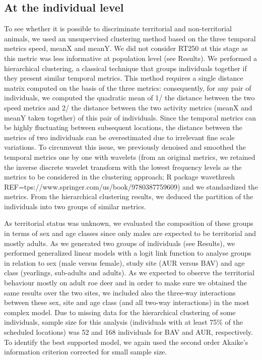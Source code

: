 \documentclass[a4paper,11pt]{article}
\newcommand{\nico}[1]{\todo[backgroundcolor=red!25,bordercolor=red]{\small #1}}
\begin{document}
\subsection*{At the individual level}
To see whether it is possible to discriminate territorial and
non-territorial animals, we used an unsupervised clustering method
based on the three temporal metrics speed, meanX and meanY. We did not
consider RT250 at this stage as this metric was less informative at
population level (see Results). We performed a hierarchical
clustering, a classical technique that groups individuals together if
they present similar temporal metrics. This method requires a single
distance matrix computed on the basis of the three metrics:
consequently, for any pair of individuals, we computed the quadratic
mean of 1/ the distance between the two speed metrics and 2/ the
distance between the two activity metrics (meanX and meanY taken
together) of this pair of individuals. Since the temporal metrics can
be highly fluctuating between subsequent locations, the distance
between the metrics of two individuals can be overestimated due to
irrelevant fine scale variations. To circumvent this issue, we
previously denoised and smoothed the temporal metrics one by one with
wavelets (from an original metrics, we retained the inverse discrete
wavelet transform with the lowest frequency levels as the metrics to
be considered in the clustering approach; R package
\textsf{wavethresh} REF=tps://www.springer.com/us/book/9780387759609)
and we standardized the metrics. From the hierarchical clustering
results, we deduced the partition of the individuals into two groups
of similar metrics.

As territorial status was unknown, we evaluated the composition of
these groups in terms of sex and age classes since only males are
expected to be territorial and mostly adults. As we generated two
groups of individuals (see Results), we performed generalized linear
models with a logit link function to analyse groups in relation to sex
(male versus female), study site (AUR versus BAV) and age class
(yearlings, sub-adults and adults). As we expected to observe the
territorial behaviour mostly on adult roe deer and in order to make
sure we obtained the same results over the two sites, we included also
the three-way interactions between these sex, site and age class (and
all two-way interactions) in the most complex model. Due to missing
data for the hierarchical clustering of some individuals, sample size
for this analysis (individuals with at least 75\% of the scheduled
locations) was 52 and 168 individuals for BAV and AUR,
respectively.\nico{On n'a pas le même nombre d'individus à l'issu du
  clustering} To identify the best supported model, we again used the
second order Akaike’s information criterion corrected for small sample
size.
\end{document}

